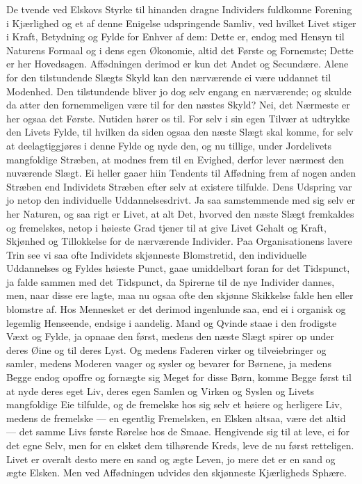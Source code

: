 \documentclass[12pt,a4paper]{book}
\newcommand{\apage}[1]{\marginnote{\footnotesize\textit{[#1]}}}
\begin{document}
De tvende ved Elskovs Styrke til hinanden dragne Individers fuldkomne
Forening i Kjærlighed og et af denne Enigelse udspringende Samliv, ved
hvilket Livet stiger i Kraft, Betydning og Fylde for Enhver af dem:
Dette er, endog med Hensyn til Naturens Formaal og i dens egen Økonomie,
altid det Første og Fornemste; Dette er her Hovedsagen. Affødningen
derimod er kun det Andet og Secundære. Alene for den tilstundende Slægts
Skyld kan den nærværende ei være uddannet til Modenhed. Den tilstundende
bliver jo dog selv engang en nærværende; og skulde da atter den
fornemmeligen være til for den næstes Skyld? Nei, det Nærmeste er her
ogsaa det Første. Nutiden hører os til. For selv i sin egen Tilvær at
udtrykke den Livets Fylde, til hvilken da siden ogsaa den næste Slægt
skal komme, for selv at deelagtiggjøres i denne Fylde og nyde den, og nu
tillige, under Jordelivets mangfoldige Stræben, at modnes frem til en
Evighed, derfor lever nærmest \apage{43} den nuværende Slægt. Ei heller gaaer hiin
Tendents til Affødning frem af nogen anden Stræben end Individets
Stræben efter selv at existere tilfulde. Dens Udspring var jo netop den
individuelle Uddannelsesdrivt. Ja saa samstemmende med sig selv er her
Naturen, og saa rigt er Livet, at alt Det, hvorved den næste Slægt
fremkaldes og fremelskes, netop i høieste Grad tjener til at give Livet
Gehalt og Kraft, Skjønhed og Tillokkelse for de nærværende Individer.
Paa Organisationens lavere Trin see vi saa ofte Individets skjønneste
Blomstretid, den individuelle Uddannelses og Fyldes høieste Punct, gaae
umiddelbart foran for det Tidspunct, ja falde sammen med det Tidspunct,
da Spirerne til de nye Individer dannes, men, naar disse ere lagte, maa
nu ogsaa ofte den skjønne Skikkelse falde hen eller blomstre af. Hos
Mennesket er det derimod ingenlunde saa, end ei i organisk og legemlig
Henseende, endsige i aandelig. Mand og Qvinde staae i den frodigste
Væxt og Fylde, ja opnaae den først, medens den næste Slægt spirer op
under deres Øine og til deres Lyst. Og medens Faderen virker og
tilveiebringer og samler, medens Moderen vaager og sysler og bevarer for
Børnene, ja medens Begge endog opoffre og fornægte sig Meget for disse
Børn, komme Begge først til at nyde deres eget Liv, deres egen Samlen og
Virken og Syslen og Livets mangfoldige Eie tilfulde, og de fremelske hos
sig selv et høiere og herligere Liv, medens de \apage{44} fremelske --- en egentlig
Fremelsken, en Elsken altsaa, være det altid --- det samme Livs første
Rørelse hos de Smaae. Hengivende sig til at leve, ei for det egne Selv,
men for en elsket dem tilhørende Kreds, leve de nu først retteligen.
Livet er overalt desto mere en sand og ægte Leven, jo mere det er en
sand og ægte Elsken. Men ved Affødningen udvides den skjønneste
Kjærligheds Sphære.
\end{document}
